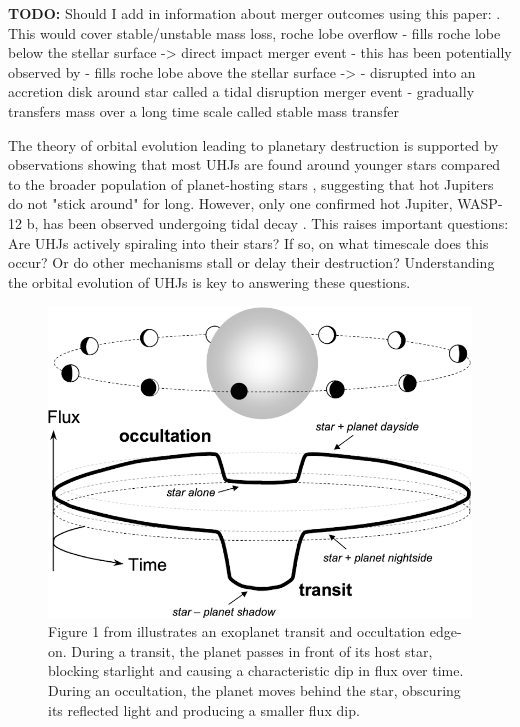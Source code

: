 \documentclass[oneside,12pt]{amsart}
\numberwithin{page}{section}
\begin{document}
\textbf{TODO:} Should I add in information about merger outcomes using this paper: \citet{metzger2012optical}. This would cover stable/unstable mass loss, roche lobe overflow
- fills roche lobe below the stellar surface -> direct impact merger event
    - this has been potentially observed by \citep{de2023infrared}
- fills roche lobe above the stellar surface -> 
    - disrupted into an accretion disk around star called a tidal disruption merger event
    - gradually transfers mass over a long time scale called stable mass transfer

The theory of orbital evolution leading to planetary destruction is supported by observations showing that most UHJs are found around younger stars compared to the broader population of planet-hosting stars \citep{hamer2019hot}, suggesting that hot Jupiters do not "stick around" for long. However, only one confirmed hot Jupiter, WASP-12 b, has been observed undergoing tidal decay \citep{yee2019orbit}. This raises important questions: Are UHJs actively spiraling into their stars? If so, on what timescale does this occur? Or do other mechanisms stall or delay their destruction? Understanding the orbital evolution of UHJs is key to answering these questions.

\begin{figure}[htbp]
    \centering
    \includegraphics[width=0.7\linewidth]{figs/winn_fig1.png}
    \caption{Figure 1 from \citet{winn2010transits} illustrates an exoplanet transit and occultation edge-on. During a transit, the planet passes in front of its host star, blocking starlight and causing a characteristic dip in flux over time. During an occultation, the planet moves behind the star, obscuring its reflected light and producing a smaller flux dip.}
    \label{fig:winnfig1}
\end{figure}
\end{document}
